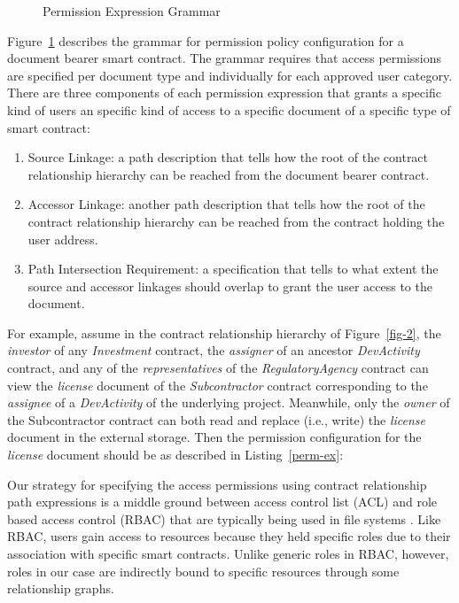 \begin{figure}[t!]
\begin{bnf*}
\\
\\
\\
\\
\\
\end{bnf*}
\normalsize
\caption{Permission Expression Grammar}
\label{grammar}
\end{figure}

Figure~\ref{grammar} describes the grammar for permission policy configuration for a document bearer smart contract. The grammar requires that access permissions are specified per document type and individually for each approved user category. There are three components of each permission expression that grants a specific kind of users an specific kind of access to a specific document of a specific type of smart contract:
\begin{enumerate}
\item Source Linkage: a path description that tells how the root of the contract relationship hierarchy can be reached from the document bearer contract.
\item Accessor Linkage: another path description that tells how the root of the contract relationship hierarchy can be reached from the contract holding the user address.
\item Path Intersection Requirement: a specification that tells to what extent the source and accessor linkages should overlap to grant the user access to the document.
\end{enumerate}

For example, assume in the contract relationship hierarchy of Figure~\ref{fig-2}, the {\it investor} of any {\it Investment} contract, the {\it assigner} of an ancestor {\it DevActivity} contract, and any of the {\it representatives} of the {\it RegulatoryAgency} contract can view the {\it license} document of the {\it Subcontractor} contract corresponding to the {\it assignee} of a {\it DevActivity} of the underlying project. Meanwhile, only the {\it owner} of the {Subcontractor} contract can both read and replace (i.e., write) the {\it license} document in the external storage. Then the permission configuration for the {\it license} document should be as described in Listing~\ref{perm-ex}:
\lstset{caption=Example access permission configuration, label=perm-ex}

Our strategy for specifying the access permissions using contract relationship path expressions is a middle ground between access control list (ACL) and role based access control (RBAC) that are typically being used in file systems \cite{Barkley:1997:CSR:266741.266769}. Like RBAC, users gain access to resources because they held specific roles due to their association with specific smart contracts. Unlike generic roles in RBAC, however, roles in our case are indirectly bound to specific resources through some relationship graphs.       

